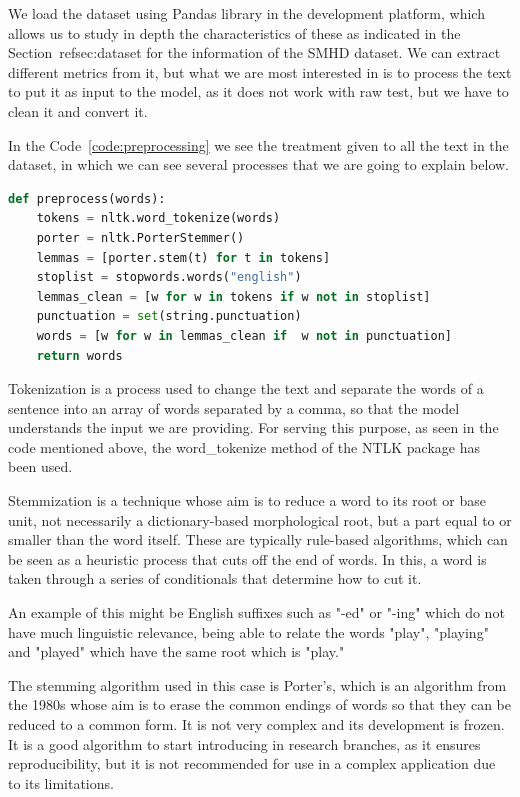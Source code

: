 We load the dataset using Pandas library in the development platform, which allows us to study in depth the characteristics of these as indicated in the Section~ref{sec:dataset} for the information of the SMHD dataset. We can extract different metrics from it, but what we are most interested in is to process the text to put it as input to the model, as it does not work with raw test, but we have to clean it and convert it.

In the Code~\ref{code:preprocessing} we see the treatment given to all the text in the dataset, in which we can see several processes that we are going to explain below.

\begin{lstlisting}[language=Python, caption={Preprocessing used function}, label={code:preprocessing}]
def preprocess(words):
    tokens = nltk.word_tokenize(words)
    porter = nltk.PorterStemmer()
    lemmas = [porter.stem(t) for t in tokens]
    stoplist = stopwords.words("english")
    lemmas_clean = [w for w in tokens if w not in stoplist]
    punctuation = set(string.punctuation)
    words = [w for w in lemmas_clean if  w not in punctuation]
    return words
\end{lstlisting}

Tokenization is a process used to change the text and separate the words of a sentence into an array of words separated by a comma, so that the model understands the input we are providing. For serving this purpose, as seen in the code mentioned above, the word\_tokenize method of the NTLK package has been used.

Stemmization is a technique whose aim is to reduce a word to its root or base unit, not necessarily a dictionary-based morphological root, but a part equal to or smaller than the word itself. These are typically rule-based algorithms, which can be seen as a heuristic process that cuts off the end of words. In this, a word is taken through a series of conditionals that determine how to cut it.

An example of this might be English suffixes such as "-ed" or "-ing" which do not have much linguistic relevance, being able to relate the words "play", "playing" and "played" which have the same root which is "play."

The stemming algorithm used in this case is Porter's, which is an algorithm from the 1980s whose aim is to erase the common endings of words so that they can be reduced to a common form. It is not very complex and its development is frozen. It is a good algorithm to start introducing in research branches, as it ensures reproducibility, but it is not recommended for use in a complex application due to its limitations.

